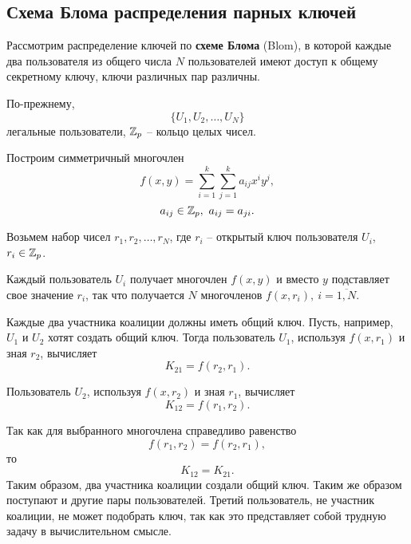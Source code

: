 \subsection{Схема Блома распределения парных ключей}

Рассмотрим распределение ключей по \textbf{схеме Блома} (Blom), в которой каждые два пользователя из общего числа $N$ пользователей имеют доступ к общему секретному ключу, ключи различных пар различны.

По-прежнему,
    \[ \{ U_1, U_2, \dots, U_N \} \]
легальные пользователи, $\mathbb{Z}_p$ -- кольцо целых чисел.

Построим симметричный многочлен
    \[ f(x,y) = \sum_{i=1}^k \sum_{j=1}^k a_{ij} x^i y^j, \]
    \[ a_{ij} \in \mathbb{Z}_p, ~ a_{ij} = a_{ji}. \]

Возьмем набор чисел $r_1, r_2, \dots, r_N$, где $r_i$ -- открытый ключ пользователя $U_i$, ~ $r_i \in \mathbb{Z}_p$.

Каждый пользователь $U_i$ получает многочлен $f(x,y)$ и вместо $y$ подставляет свое значение $r_i$, так что получается $N$ многочленов $f(x, r_i), ~ i = \overline{1,N}$.

Каждые два участника коалиции должны иметь общий ключ. Пусть, например, $U_1$ и $U_2$ хотят создать общий ключ. Тогда пользователь $U_1$, используя $f(x, r_1)$ и зная $r_2$, вычисляет
    \[ K_{21} = f(r_2, r_1). \]

Пользователь $U_2$, используя $f(x, r_2)$ и зная $r_1$, вычисляет
    \[ K_{12} = f(r_1, r_2). \]

Так как для выбранного многочлена справедливо равенство
    \[ f(r_1, r_2) = f(r_2, r_1), \]
то
    \[ K_{12} = K_{21}. \]
Таким образом, два участника коалиции создали общий ключ. Таким же образом поступают и другие пары пользователей. Третий пользователь, не участник коалиции, не может подобрать ключ, так как это представляет собой трудную задачу в вычислительном смысле.

